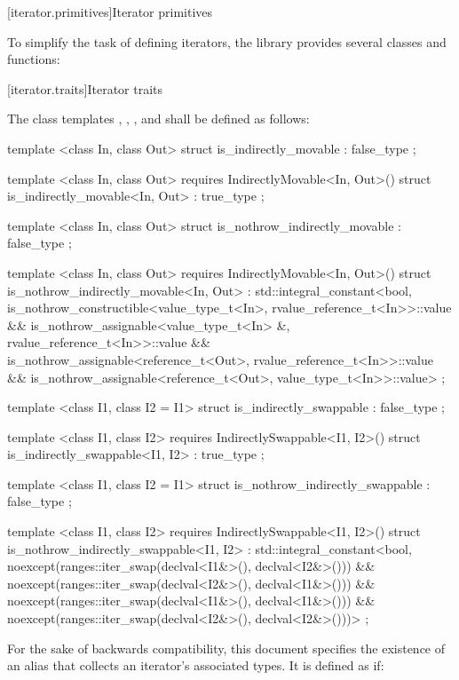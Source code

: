 [iterator.primitives]{Iterator primitives}

\pnum
To simplify the task of defining iterators, the library provides
several classes and functions:

[iterator.traits]{Iterator traits}

\pnum
The class templates ,
, ,
and  shall be defined as follows:

\begin{codeblock}
template <class In, class Out>
struct is_indirectly_movable : false_type { };

template <class In, class Out>
  requires IndirectlyMovable<In, Out>()
struct is_indirectly_movable<In, Out> : true_type { };

template <class In, class Out>
struct is_nothrow_indirectly_movable : false_type { };

template <class In, class Out>
  requires IndirectlyMovable<In, Out>()
struct is_nothrow_indirectly_movable<In, Out> :
  std::integral_constant<bool,
    is_nothrow_constructible<value_type_t<In>, rvalue_reference_t<In>>::value &&
    is_nothrow_assignable<value_type_t<In> &, rvalue_reference_t<In>>::value &&
    is_nothrow_assignable<reference_t<Out>, rvalue_reference_t<In>>::value &&
    is_nothrow_assignable<reference_t<Out>, value_type_t<In>>::value>
{ };

template <class I1, class I2 = I1>
struct is_indirectly_swappable : false_type { };

template <class I1, class I2>
  requires IndirectlySwappable<I1, I2>()
struct is_indirectly_swappable<I1, I2> : true_type { };

template <class I1, class I2 = I1>
struct is_nothrow_indirectly_swappable : false_type { };

template <class I1, class I2>
  requires IndirectlySwappable<I1, I2>()
struct is_nothrow_indirectly_swappable<I1, I2> :
  std::integral_constant<bool,
    noexcept(ranges::iter_swap(declval<I1&>(), declval<I2&>())) &&
    noexcept(ranges::iter_swap(declval<I2&>(), declval<I1&>())) &&
    noexcept(ranges::iter_swap(declval<I1&>(), declval<I1&>())) &&
    noexcept(ranges::iter_swap(declval<I2&>(), declval<I2&>()))>
{ };
\end{codeblock}

\pnum
For the sake of backwards compatibility, this document specifies the existence of an 
alias that collects an iterator's associated types. It is defined as if:

